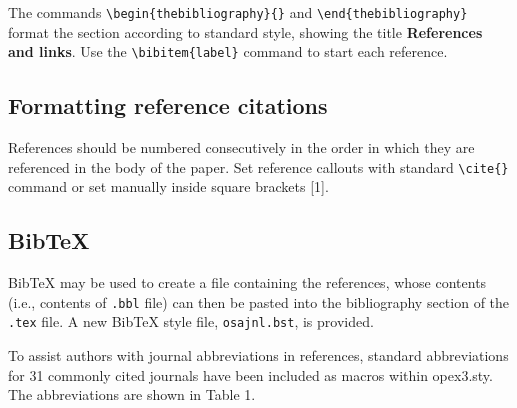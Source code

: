 \documentclass[10pt,letterpaper]{article}
\begin{document}
The commands \verb+\begin{thebibliography}{}+ and
\verb+\end{thebibliography}+ format the section according to
standard style, showing the title {\bf References and links}.  Use the
\verb+\bibitem{label}+ command to start each reference.
\subsection{Formatting reference citations}
References should be numbered consecutively in the order in which
they are referenced in the body of the paper. Set reference callouts with standard \verb+\cite{}+ command or set manually inside square brackets [1]. 

\subsection{Bib\TeX}
\label{sec:bibtex}
Bib\TeX{} may be used to create a file containing the references, whose contents (i.e., contents of \texttt{.bbl} file) can then be pasted into the bibliography section of the \texttt{.tex} file. A new Bib\TeX{} style file, \texttt{osajnl.bst}, is provided.

To assist authors with journal abbreviations in references, standard abbreviations for 31 commonly cited journals have been included as macros within opex3.sty.  The abbreviations are shown in Table 1. 
\end{document}
